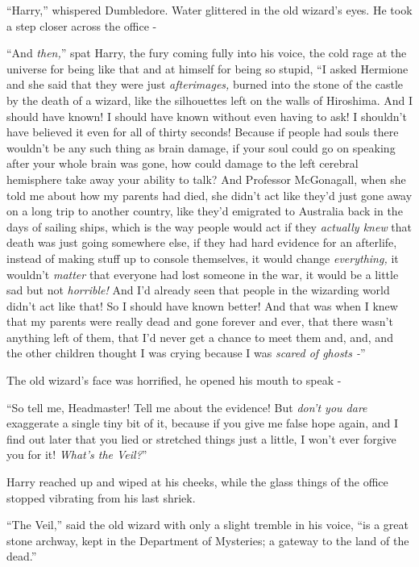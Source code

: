 ``Harry,'' whispered Dumbledore. Water glittered in the old wizard's eyes. He took a step closer across the office -

``And \emph{then,}'' spat Harry, the fury coming fully into his voice, the cold rage at the universe for being like that and at himself for being so stupid, ``I asked Hermione and she said that they were just \emph{afterimages,} burned into the stone of the castle by the death of a wizard, like the silhouettes left on the walls of Hiroshima. And I should have known! I should have known without even having to ask! I shouldn't have believed it even for all of thirty seconds! Because if people had souls there wouldn't be any such thing as brain damage, if your soul could go on speaking after your whole brain was gone, how could damage to the left cerebral hemisphere take away your ability to talk? And Professor McGonagall, when she told me about how my parents had died, she didn't act like they'd just gone away on a long trip to another country, like they'd emigrated to Australia back in the days of sailing ships, which is the way people would act if they \emph{actually knew} that death was just going somewhere else, if they had hard evidence for an afterlife, instead of making stuff up to console themselves, it would change \emph{everything,} it wouldn't \emph{matter} that everyone had lost someone in the war, it would be a little sad but not \emph{horrible!} And I'd already seen that people in the wizarding world didn't act like that! So I should have known better! And that was when I knew that my parents were really dead and gone forever and ever, that there wasn't anything left of them, that I'd never get a chance to meet them and, and, and the other children thought I was crying because I was \emph{scared of ghosts -}''

The old wizard's face was horrified, he opened his mouth to speak -

``So tell me, Headmaster! Tell me about the evidence! But \emph{don't you dare} exaggerate a single tiny bit of it, because if you give me false hope again, and I find out later that you lied or stretched things just a little, I won't ever forgive you for it! \emph{What's the Veil?}''

Harry reached up and wiped at his cheeks, while the glass things of the office stopped vibrating from his last shriek.

``The Veil,'' said the old wizard with only a slight tremble in his voice, ``is a great stone archway, kept in the Department of Mysteries; a gateway to the land of the dead.''

